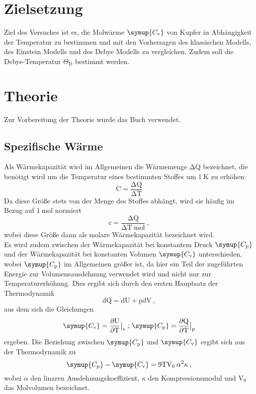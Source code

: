 \section{Zielsetzung}
Ziel des Versuches ist es, die Molwärme $\symup{C_{\text{v}}}$ von Kupfer in Abhängigkeit der
Temperatur zu bestimmen und mit den Vorhersagen des klassischen Modells, des Einstein
Modells und des Debye Modells zu vergleichen. Zudem soll die Debye-Temperatur
$\Theta_{\text{D}}$ bestimmt werden.

\section{Theorie}
Zur Vorbereitung der Theorie wurde das Buch \cite{fkp} verwendet.
\subsection{Spezifische Wärme}
Als Wärmekapazität wird im Allgemeinen die Wärmemenge $\increment \text{Q}$ bezeichnet,
die benötigt wird um
die Temperatur eines
bestimmten Stoffes um $\SI{1}{\kelvin}$ zu erhöhen:
\begin{equation}
  \text{C} = \frac{\increment \text{Q}}{\increment \text{T}}
  \label{eqn:warm}
\end{equation}
Da diese Größe stets von der Menge des Stoffes abhängt, wird sie häufig im
Bezug auf $\SI{1}{\mol}$ normiert
\begin{equation}
  \text{c} = \frac{\increment \text{Q}}{\increment \text{T} \: \text{mol}} \: ,
  \label{eqn:cmol}
\end{equation}
wobei diese Größe dann als molare Wärmekapazität bezeichnet wird.  \\
Es wird zudem zwischen der Wärmekapazität bei konstantem Druck $\symup{C_{\text{p}}}$ und der Wärmekapazität bei
konstanten Volumen $\symup{C_{\text{v}}}$ unterschieden, wobei $\symup{C_{\text{p}}}$
im Allgemeinen größer ist, da hier ein Teil der zugeführten Energie zur Volumensausdehnung verwendet
wird und nicht nur zur Temperaturerhöhung.
Dies ergibt sich durch den ersten Hauptsatz der Thermodynamik
\begin{equation}
  \text{dQ} = \text{dU} + \text{pdV} \: ,
  \label{eqn:hs1}
\end{equation}
aus dem sich die Gleichungen
\begin{equation}
  \symup{C_{\text{v}}} = \frac{\partial\text{U}}{\partial\text{T}}\bigr|_{\text{v}}\; \text{;} \;
  \symup{C_{\text{p}}} = \frac{\partial\text{Q}}{\partial\text{T}}\bigr|_{\text{p}}
\end{equation}
ergeben. Die Beziehung zwischen $\symup{C_{\text{p}}}$ und $\symup{C_{\text{v}}}$
ergibt sich aus der Thermodynamik zu
\begin{equation}
  \symup{C_{\text{p}}}-\symup{C_{\text{v}}}=9 \text{TV}_0\:\alpha^2\kappa \: ,
  \label{eqn:cpcv}
\end{equation}
wobei $\alpha$ den linaren Ausdehnungskoeffizient, $\kappa$ den Kompressionsmodul und
$\text{V}_0$ das Molvolumen bezeichnet.

